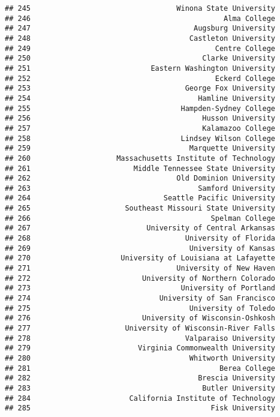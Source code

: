 \documentclass[
]{article}
\begin{document}
\begin{verbatim}
## 245                                  Winona State University
## 246                                             Alma College
## 247                                      Augsburg University
## 248                                     Castleton University
## 249                                           Centre College
## 250                                        Clarke University
## 251                            Eastern Washington University
## 252                                           Eckerd College
## 253                                    George Fox University
## 254                                       Hamline University
## 255                                   Hampden-Sydney College
## 256                                        Husson University
## 257                                        Kalamazoo College
## 258                                   Lindsey Wilson College
## 259                                     Marquette University
## 260                    Massachusetts Institute of Technology
## 261                        Middle Tennessee State University
## 262                                  Old Dominion University
## 263                                       Samford University
## 264                               Seattle Pacific University
## 265                      Southeast Missouri State University
## 266                                          Spelman College
## 267                           University of Central Arkansas
## 268                                    University of Florida
## 269                                     University of Kansas
## 270                     University of Louisiana at Lafayette
## 271                                  University of New Haven
## 272                          University of Northern Colorado
## 273                                   University of Portland
## 274                              University of San Francisco
## 275                                     University of Toledo
## 276                          University of Wisconsin-Oshkosh
## 277                      University of Wisconsin-River Falls
## 278                                    Valparaiso University
## 279                         Virginia Commonwealth University
## 280                                     Whitworth University
## 281                                            Berea College
## 282                                       Brescia University
## 283                                        Butler University
## 284                       California Institute of Technology
## 285                                          Fisk University

\end{verbatim}
\end{document}
